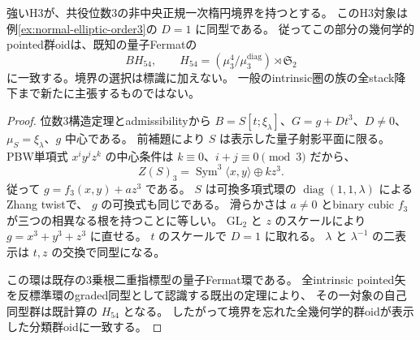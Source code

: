 \begin{theorem}[位数3非中央正規楕円境界の幾何学的分類]
\label{thm:normal-order3-quantum-Fermat}
強いH3が、共役位数3の非中央正規一次楕円境界を持つとする。
このH3対象は例\ref{ex:normal-elliptic-order3}の $D=1$ に同型である。
従ってこの部分の幾何学的pointed群oidは、既知の量子Fermatの
\[
 B H_{54},\qquad
 H_{54}=(\mu_3^4/\mu_3^{\mathrm{diag}})\rtimes\mathfrak S_2
\]
に一致する。境界の選択は標識に加えない。
一般のintrinsic圏の族の全stack降下まで新たに主張するものではない。
\end{theorem}
\begin{proof}
位数3構造定理とadmissibilityから
$B=S[t;\xi_\lambda]$、$G=g+Dt^3$、$D\ne0$、
$\mu_S=\xi_\lambda$、$g$ 中心である。
前補題により $S$ は表示した量子射影平面に限る。
PBW単項式 $x^iy^jz^k$ の中心条件は
$k\equiv0$、$i+j\equiv0\pmod3$ だから、
\[
 Z(S)_3=\operatorname{Sym}^3\langle x,y\rangle\oplus kz^3.
\]
従って $g=f_3(x,y)+az^3$ である。
$S$ は可換多項式環の $\operatorname{diag}(1,1,\lambda)$ によるZhang twistで、
$g$ の可換式も同じである。
滑らかさは $a\ne0$ とbinary cubic $f_3$ が三つの相異なる根を持つことに等しい。
$\mathrm{GL}_2$ と $z$ のスケールにより $g=x^3+y^3+z^3$ に直せる。
$t$ のスケールで $D=1$ に取れる。
$\lambda$ と $\lambda^{-1}$ の二表示は $t,z$ の交換で同型になる。

この環は既存の3乗根二重指標型の量子Fermat環である。
全intrinsic pointed矢を反標準環のgraded同型として認識する既出の定理により、
その一対象の自己同型群は既計算の $H_{54}$ となる。
したがって境界を忘れた全幾何学的群oidが表示した分類群oidに一致する。
\end{proof}
